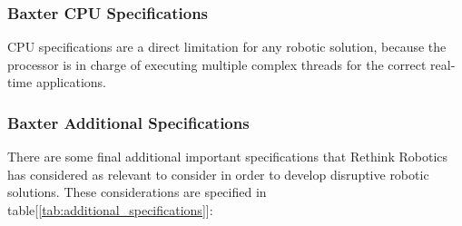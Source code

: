 \documentclass[11pt]{report} %
\begin{document}
\subsubsection{Baxter CPU Specifications}

CPU specifications are a direct limitation for any robotic solution, because the processor is in charge of executing multiple complex threads for the correct real-time applications.\\

\begin{table}[H]
\begin{center}
\caption{\label{tab:cpu_specifications} CPU specifications for Baxter robot. Adapted from \citep{cite_baxter_hardware_specifications}.}
\end{center}
\end{table}


\subsubsection{Baxter Additional Specifications}

There are some final additional important specifications that Rethink Robotics has considered as relevant to consider in order to develop disruptive robotic solutions. These considerations are specified in table[\ref{tab:additional_specifications}]:
\end{document}
